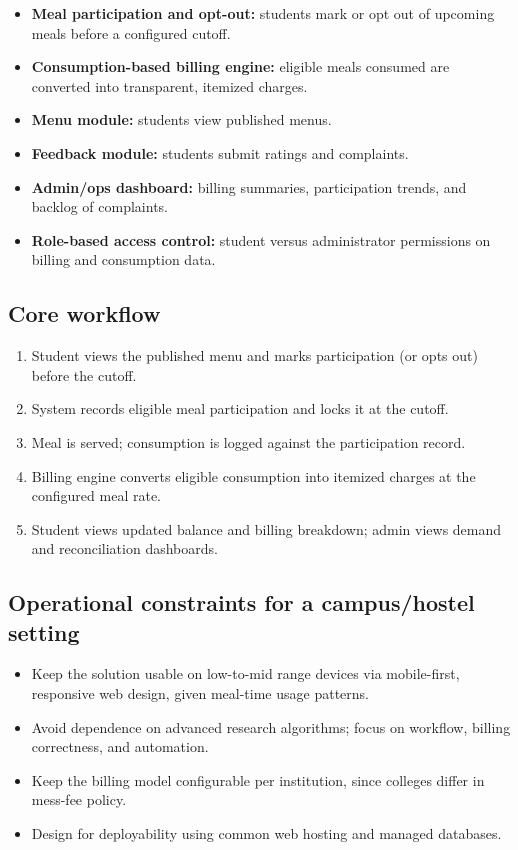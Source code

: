 \documentclass[12pt,a4paper]{article}
\begin{document}
\begin{itemize}
    \item \textbf{Meal participation and opt-out:} students mark or opt out of
    upcoming meals before a configured cutoff.
    \item \textbf{Consumption-based billing engine:} eligible meals consumed
    are converted into transparent, itemized charges.
    \item \textbf{Menu module:} students view published menus.
    \item \textbf{Feedback module:} students submit ratings and complaints.
    \item \textbf{Admin/ops dashboard:} billing summaries, participation
    trends, and backlog of complaints.
    \item \textbf{Role-based access control:} student versus administrator
    permissions on billing and consumption data.
\end{itemize}

\subsection{Core workflow}

\begin{enumerate}
    \item Student views the published menu and marks participation (or opts
    out) before the cutoff.
    \item System records eligible meal participation and locks it at the
    cutoff.
    \item Meal is served; consumption is logged against the participation
    record.
    \item Billing engine converts eligible consumption into itemized charges
    at the configured meal rate.
    \item Student views updated balance and billing breakdown; admin views
    demand and reconciliation dashboards.
\end{enumerate}

\subsection{Operational constraints for a campus/hostel setting}

\begin{itemize}
    \item Keep the solution usable on low-to-mid range devices via
    mobile-first, responsive web design, given meal-time usage patterns.
    \item Avoid dependence on advanced research algorithms; focus on
    workflow, billing correctness, and automation.
    \item Keep the billing model configurable per institution, since colleges
    differ in mess-fee policy.
    \item Design for deployability using common web hosting and managed
    databases.
\end{itemize}
\end{document}
